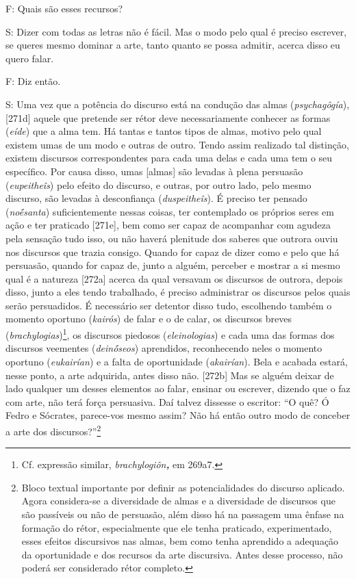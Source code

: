 F: Quais são esses recursos?

S: Dizer com todas as letras não é fácil. Mas o modo pelo qual é preciso
escrever, se queres mesmo dominar a arte, tanto quanto se possa admitir,
acerca disso eu quero falar.

F: Diz então.

S: Uma vez que a potência do discurso está na condução das almas
(\emph{psychagôgía}), {[}271d{]} aquele que pretende ser rétor deve
necessariamente conhecer as formas (\emph{eíde}) que a alma tem. Há
tantas e tantos tipos de almas, motivo pelo qual existem umas de um modo
e outras de outro. Tendo assim realizado tal distinção, existem
discursos correspondentes para cada uma delas e cada uma tem o seu
específico. Por causa disso, umas {[}almas{]} são levadas à plena
persuasão (\emph{eupeitheîs}) pelo efeito do discurso, e outras, por
outro lado, pelo mesmo discurso, são levadas à desconfiança
(\emph{duspeitheîs}). É preciso ter pensado (\emph{noḗsanta})
suficientemente nessas coisas, ter contemplado os próprios seres em ação
e ter praticado {[}271e{]}, bem como ser capaz de acompanhar com agudeza
pela sensação tudo isso, ou não haverá plenitude dos saberes que outrora
ouviu nos discursos que trazia consigo. Quando for capaz de dizer como e
pelo que há persuasão, quando for capaz de, junto a alguém, perceber e
mostrar a si mesmo qual é a natureza {[}272a{]} acerca da qual versavam
os discursos de outrora, depois disso, junto a eles tendo trabalhado, é
preciso administrar os discursos pelos quais serão persuadidos. É
necessário ser detentor disso tudo, escolhendo também o momento oportuno
(\emph{kairós}) de falar e o de calar, os discursos breves
(\emph{brachylogias})\footnote{Cf. expressão similar,
  \emph{brachylogiôn\textbf{,}} em 269a7.}, os discursos piedosos
(\emph{eleinologias}) e cada uma das formas dos discursos veementes
(\emph{deinṓseos}) aprendidos, reconhecendo neles o momento oportuno
(\emph{eukairían}) e a falta de oportunidade (\emph{akairían}). Bela e
acabada estará, nesse ponto, a arte adquirida, antes disso não.
{[}272b{]} Mas se alguém deixar de lado qualquer um desses elementos ao
falar, ensinar ou escrever, dizendo que o faz com arte, não terá força
persuasiva. Daí talvez dissesse o escritor: ``O quê? Ó Fedro e Sócrates,
parece-vos mesmo assim? Não há então outro modo de conceber a arte dos
discursos?''\footnote{Bloco textual importante por definir as
  potencialidades do discurso aplicado. Agora considera-se a diversidade
  de almas e a diversidade de discursos que são passíveis ou não de
  persuasão, além disso há na passagem uma ênfase na formação do rétor,
  especialmente que ele tenha praticado, experimentado, esses efeitos
  discursivos nas almas, bem como tenha aprendido a adequação da
  oportunidade e dos recursos da arte discursiva. Antes desse processo,
  não poderá ser considerado rétor completo.}

